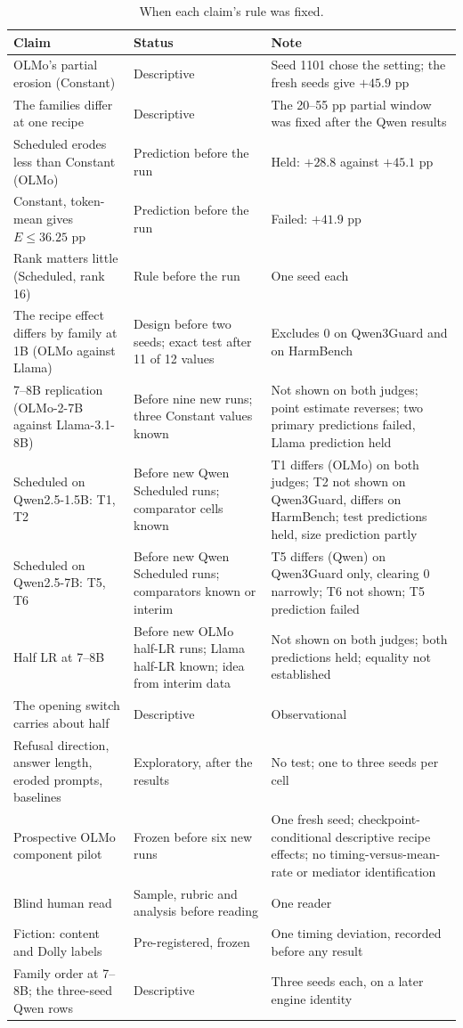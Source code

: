 \documentclass[11pt]{article}
\begin{document}
\begin{table}[t]
  \caption{When each claim's rule was fixed.}
  \label{tab:claims}
  \centering
  \footnotesize
  \begin{tabular}{@{}L{4.8cm}L{3.4cm}L{6.4cm}@{}}
    \toprule
    Claim & Status & Note \\
    \midrule
    OLMo's partial erosion (Constant) & Descriptive & Seed 1101 chose the setting; the fresh seeds give $+45.9$ pp \\
    The families differ at one recipe & Descriptive & The 20--55 pp partial window was fixed after the Qwen results \\
    Scheduled erodes less than Constant (OLMo) & Prediction before the run & Held: $+28.8$ against $+45.1$ pp \\
    Constant, token-mean gives $E \le 36.25$ pp & Prediction before the run & Failed: $+41.9$ pp \\
    Rank matters little (Scheduled, rank 16) & Rule before the run & One seed each \\
    The recipe effect differs by family at 1B (OLMo against Llama) & Design before two seeds; exact test after 11 of 12 values & Excludes 0 on Qwen3Guard and on HarmBench \\
    7--8B replication (OLMo-2-7B against Llama-3.1-8B) & Before nine new runs; three Constant values known & Not shown on both judges; point estimate reverses; two primary predictions failed, Llama prediction held \\
    Scheduled on Qwen2.5-1.5B: T1, T2 & Before new Qwen Scheduled runs; comparator cells known & T1 differs (OLMo) on both judges; T2 not shown on Qwen3Guard, differs on HarmBench; test predictions held, size prediction partly \\
    Scheduled on Qwen2.5-7B: T5, T6 & Before new Qwen Scheduled runs; comparators known or interim & T5 differs (Qwen) on Qwen3Guard only, clearing 0 narrowly; T6 not shown; T5 prediction failed \\
    Half LR at 7--8B & Before new OLMo half-LR runs; Llama half-LR known; idea from interim data & Not shown on both judges; both predictions held; equality not established \\
    The opening switch carries about half & Descriptive & Observational \\
    Refusal direction, answer length, eroded prompts, baselines & Exploratory, after the results & No test; one to three seeds per cell \\
    Prospective OLMo component pilot & Frozen before six new runs & One fresh seed; checkpoint-conditional descriptive recipe effects; no timing-versus-mean-rate or mediator identification \\
    Blind human read & Sample, rubric and analysis before reading & One reader \\
    Fiction: content and Dolly labels & Pre-registered, frozen & One timing deviation, recorded before any result \\
    Family order at 7--8B; the three-seed Qwen rows & Descriptive & Three seeds each, on a later engine identity \\
    \bottomrule
  \end{tabular}
\end{table}
\end{document}
